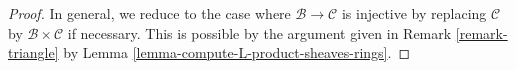 \begin{proof}
\medskip\noindent
In general, we reduce to the case where $\mathcal{B} \to \mathcal{C}$ is
injective by replacing $\mathcal{C}$ by $\mathcal{B} \times \mathcal{C}$ if
necessary. This is possible by the argument given in
Remark \ref{remark-triangle} by
Lemma \ref{lemma-compute-L-product-sheaves-rings}.
\end{proof}